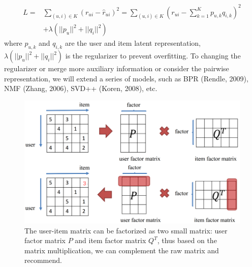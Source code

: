 \documentclass[10pt,twocolumn,letterpaper]{article}
\begin{document}
\noindent
\begin{equation*}
	\begin{split}
	L=&\sum_{(u,i)\in K}(r_{ui}-\hat{r}_{ui})^2=\sum_{(u,i)\in K}(r_{ui}-\sum_{k=1}^{K}p_{u,k}q_{i,k})^2\\
	&+\lambda (||p_u||^2+||q_i||^2)
	\end{split}\tag{1}
\end{equation*}
where $p_{u,k}$ and $q_{i,k}$ are the user and item latent representation, $\lambda (||p_u||^2+||q_i||^2)$ is the regularizer to prevent overfitting. To changing the regularizer or merge more auxiliary information or consider the pairwise representation, we will extend a series of models, such as BPR (Rendle, 2009), NMF (Zhang, 2006), SVD++ (Koren, 2008), etc. 
\begin{figure}
	\begin{center}
		\includegraphics[width=0.8\linewidth]{mf.png}
	\end{center}
	\caption{The user-item matrix can be factorized as two small matrix: user factor matrix $P$ and item factor matrix $Q^T$, thus based on the matrix multiplication, we can complement the raw matrix and recommend.}
	\label{fig:long}
	\label{fig:onecol}
\end{figure}
\end{document}
